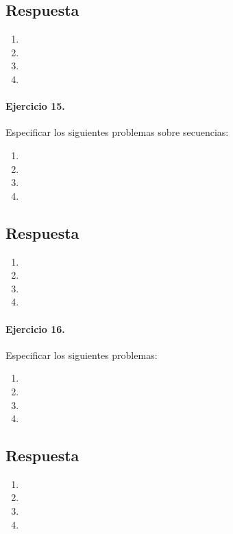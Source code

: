\documentclass[a4paper]{article}
\begin{document}
\subsection*{Respuesta}
	\begin{enumerate}[label=\alph*)]
		\item
		\item
		\item
		\item
	\end{enumerate}
	
\paragraph*{Ejercicio 15.} Especificar los siguientes problemas sobre secuencias:
	\begin{enumerate}[label=\alph*)]
		\item
		\item
		\item
		\item
	\end{enumerate}
\subsection*{Respuesta}
	\begin{enumerate}[label=\alph*)]
		\item
		\item
		\item
		\item
	\end{enumerate}
	
\paragraph*{Ejercicio 16.} Especificar los siguientes problemas:
	\begin{enumerate}[label=\alph*)]
		\item
		\item
		\item
		\item
	\end{enumerate}
\subsection*{Respuesta}
	\begin{enumerate}[label=\alph*)]
		\item
		\item
		\item
		\item
	\end{enumerate}
	
\end{document}
